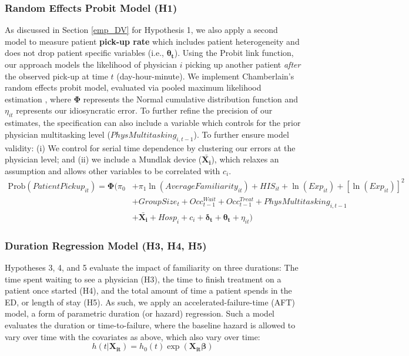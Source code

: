  \subsubsection{Random Effects Probit Model (H1)} \label{spec_probit}
 As discussed in Section \ref{emp_DV} for Hypothesis 1, we also apply a second model to measure patient \textbf{pick-up rate} which includes patient heterogeneity and does not drop patient specific variables (i.e., $\boldsymbol{\theta_t}$). Using the Probit link function, our approach models the likelihood of physician $i$ picking up another patient \textit{after} the observed pick-up at time $t$ (day-hour-minute). We implement Chamberlain’s random effects probit model, evaluated via pooled maximum likelihood estimation \citep[Ch. 15]{Wooldridge2010}, where $\boldsymbol{\Phi}$ represents the Normal cumulative distribution function and $\eta_{it}$ represents our idiosyncratic error. To further refine the precision of our estimates, the specification can also include a variable which controls for the prior physician multitasking level ($PhysMultitasking_{i,t-1}$). To further ensure model validity: (i) We control for serial time dependence by clustering our errors at the physician level; and (ii) we include a Mundlak device ($\boldsymbol{\bar{X_i}}$), which relaxes an assumption and allows other variables to be correlated with $c_i$.
  \begin{equation} \label{eqn_pu_rate_2} \begin{split} %
        \text{Prob} (PatientPickup_{it}) = \boldsymbol{\Phi} (\pi_0 & + \pi_1 \ln(AverageFamiliarity_{it}) + HIS_{it} + \ln(Exp_{it}) + [\ln(Exp_{it})]^2 \\
       & + GroupSize_{t} + Occ_{t-1}^{Wait} + Occ_{t-1}^{Treat} + PhysMultitasking_{i,t-1} \\
       & + \boldsymbol{\bar{X_i}} + Hosp_i + c_i + \boldsymbol{\delta_t} + \boldsymbol{\theta_t} + \eta_{it} )
  \end{split}  \end{equation}

 \subsubsection{Duration Regression Model (H3, H4, H5)} \label{spec_hazard}
 Hypotheses 3, 4, and 5 evaluate the impact of familiarity on three durations: The time spent waiting to see a physician (H3), the time to finish treatment on a patient once started (H4), and the total amount of time a patient spends in the ED, or length of stay (H5). As such, we apply an accelerated-failure-time (AFT) model, a form of parametric duration (or hazard) regression. Such a model evaluates the duration or time-to-failure, where the baseline hazard is allowed to vary over time with the covariates as above, which also vary over time:
  \begin{equation}
  h(t|\boldsymbol{X_{it}}) = h_0(t) \exp(\boldsymbol{X_{it}} \boldsymbol{\beta})
  \end{equation}
 
